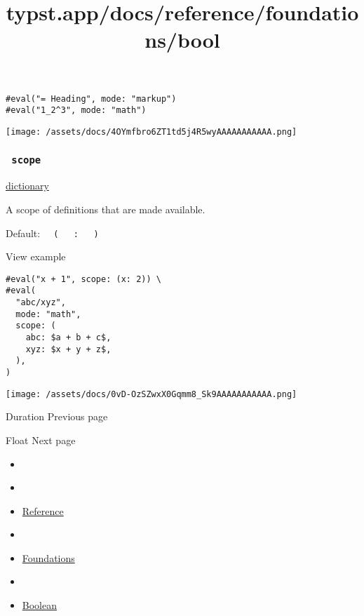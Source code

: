 \begin{verbatim}
#eval("= Heading", mode: "markup")
#eval("1_2^3", mode: "math")
\end{verbatim}

\texttt{[image: /assets/docs/4OYmfbro6ZT1td5j4R5wyAAAAAAAAAAA.png]}

\subsubsection{\texorpdfstring{\texttt{\ scope\ }}{ scope }}\label{parameters-scope}

\href{/docs/reference/foundations/dictionary/}{dictionary}

A scope of definitions that are made available.

Default:
\texttt{\ }{\texttt{\ (\ }}\texttt{\ }{\texttt{\ :\ }}\texttt{\ }{\texttt{\ )\ }}\texttt{\ }


View example

\begin{verbatim}
#eval("x + 1", scope: (x: 2)) \
#eval(
  "abc/xyz",
  mode: "math",
  scope: (
    abc: $a + b + c$,
    xyz: $x + y + z$,
  ),
)
\end{verbatim}

\texttt{[image: /assets/docs/0vD-OzSZwxX0Gqmm8\_Sk9AAAAAAAAAAA.png]}

\href{/docs/reference/foundations/duration/}{\pandocbounded{}}

{ Duration } { Previous page }

\href{/docs/reference/foundations/float/}{\pandocbounded{}}

{ Float } { Next page }


\title{typst.app/docs/reference/foundations/bool}

\begin{itemize}
\tightlist
\item
  \href{/docs}{}
\item
  
\item
  \href{/docs/reference/}{Reference}
\item
  
\item
  \href{/docs/reference/foundations/}{Foundations}
\item
  
\item
  \href{/docs/reference/foundations/bool/}{Boolean}
\end{itemize}

